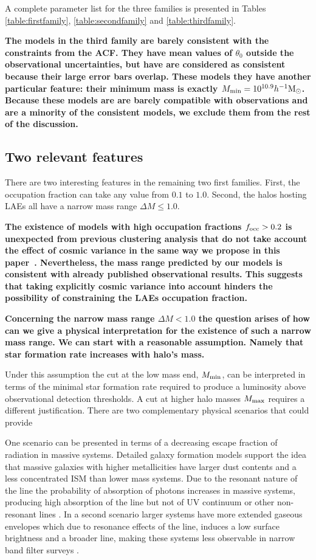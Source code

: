 \documentclass[usenatbib]{mn2e}
\newcommand{\documentname}{paper~}
\newcommand{\ly}{{\ifmmode{{\rm Ly}\alpha}\else{Ly$\alpha$~}\fi}}
\newcommand{\hMsun}{{\ifmmode{h^{-1}{\rm
        {M_{\odot}}}}\else{$h^{-1}{\rm{M_{\odot}}}$}\fi}}
\begin{document}
A complete parameter list for the three families is presented in Tables
\ref{table:firstfamily}, \ref{table:secondfamily}  and 
\ref{table:thirdfamily}. 

{\bf The models in the third family are barely consistent with the
  constraints from the ACF. They have mean values of $\theta_0$
  outside the observational uncertainties, but have
  are considered as consistent because their large error bars overlap. These
  models they have another particular feature: their minimum mass is
  exactly $M_{\rm min}=10^{10.9}\hMsun$. Because these models are
  are barely compatible with observations and are a minority of the
  consistent models, we exclude them from the rest of the discussion.}


\subsection{Two relevant features}
There are two interesting features in the remaining two first
families. First, the occupation fraction can take any value from $0.1$
to $1.0$. Second, the halos hosting LAEs all have a narrow mass range
$\Delta M\leq 1.0$.  


{\bf The existence of models with high occupation fractions $f_{\rm
    occ}>0.2$ is unexpected from previous clustering analysis that do
  not take  account the effect of cosmic variance in the same way we
  propose in this \documentname. Nevertheless, the mass range
  predicted by our models is consistent with already published
  observational results. This suggests that taking explicitly cosmic
  variance into account hinders the possibility of constraining the
  LAEs occupation fraction.}  

{\bf Concerning the narrow mass range $\Delta M
  <1.0$ the question arises of how can we give a physical
  interpretation for the existence of such  a narrow mass range. We
  can start with a reasonable   assumption. Namely that star formation
  rate increases with halo's  mass.}

Under this assumption the cut at the low mass end, $M_{\rm min}$, can be
interpreted in terms of the minimal star formation rate required to
produce a \ly luminosity above observational detection thresholds.  
A cut at higher halo masses $M_{\rm  max}$ requires a
different justification. There are two complementary physical
scenarios that could provide 

One scenario can be presented in terms of a decreasing escape fraction
of \ly radiation in massive systems. Detailed galaxy formation models
support the idea that massive galaxies with higher metallicities have
larger dust contents and a less concentrated ISM than lower mass
systems. Due to the resonant nature of the \ly line the probability of
absorption  of \ly photons increases in massive systems, producing
high absorption of the \ly line but not of UV continuum or other
non-resonant lines \citep{Laursen2009,ForeroRomero2011}. In a second
scenario larger systems have more extended gaseous envelopes which due
to resonance effects of the \ly line, induces a low surface brightness
and a broader line, making these systems less observable in narrow
band filter surveys \citep{Laursen2009,Zheng2010}.    
\end{document}
